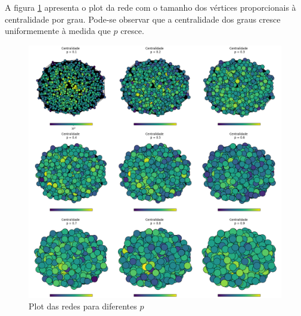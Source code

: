 \documentclass[12pt]{article}
\begin{document}
A figura \ref{plotredesdiferentesp} apresenta o plot da rede com o tamanho dos vértices proporcionais à centralidade por grau. Pode-se observar que a centralidade dos graus cresce uniformemente à medida que $p$ cresce. 

\begin{figure}[h!]
    \centering
    \includegraphics[width=0.9\linewidth]{plotRedes.png}
    \caption{Plot das redes para diferentes $p$}
    \label{plotredesdiferentesp}
\end{figure}





\end{document}
